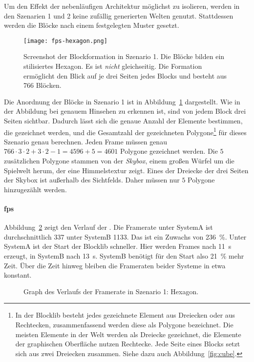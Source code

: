 
Um den Effekt der nebenläufigen Architektur möglichst zu isolieren, werden in den Szenarien 1 und 2 keine zufällig generierten Welten genutzt. Stattdessen werden die Blöcke nach einem festgelegten Muster gesetzt.

\begin{figure}
	\centering
	\texttt{[image: fps-hexagon.png]}
	\caption[Screenshot der Blockformation in Szenario 1 der Performanceanalyse.]{Screenshot der Blockformation in Szenario 1. Die Blöcke bilden ein stilisiertes Hexagon. Es ist \emph{nicht} gleichseitig. Die Formation ermöglicht den Blick auf je drei Seiten jedes Blocks und besteht aus 766 Blöcken.}\label{fig:hexagon}
\end{figure}
Die Anordnung der Blöcke in Szenario 1 ist in Abbildung~\ref{fig:hexagon} dargestellt. Wie in der Abbildung bei genauem Hinsehen zu erkennen ist, sind von jedem Block drei Seiten sichtbar. Dadurch lässt sich die genaue Anzahl der Elemente bestimmen, die gezeichnet werden, und die Gesamtzahl der gezeichneten Polygone\footnote{In der Blocklib besteht jedes gezeichnete Element aus Dreiecken oder aus Rechtecken, zusammenfassend werden diese als Polygone bezeichnet. Die meisten Elemente in der Welt werden als Dreiecke gezeichnet, die Elemente der graphischen Oberfläche nutzen Rechtecke. Jede Seite eines Blocks setzt sich aus zwei Dreiecken zusammen. Siehe dazu auch Abbildung~\vref{fig:cube}.} für dieses Szenario genau berechnen. Jeden Frame müssen genau $766\cdot3\cdot2 + 3\cdot2-1 = 4596 +5 = 4601$ Polygone gezeichnet werden. Die $5$ zusätzlichen Polygone stammen von der \emph{Skybox}, einem großen Würfel um die Spielwelt herum, der eine Himmelstextur zeigt. Eines der Dreiecke der drei Seiten der Skybox ist außerhalb des Sichtfelds. Daher müssen nur $5$ Polygone hinzugezählt werden.


\paragraph{\ac{fps}} Abbildung~\ref{fig:seed-0-hexagon-fps} zeigt den Verlauf der \si{\fps}. Die Framerate unter SystemA ist durchschnittlich \SI{337}{\fps} unter SystemB \SI{1133}{\fps}. Das ist ein Zuwachs von \SI{236}{\percent}. Unter SystemA ist der Start der Blocklib schneller. Hier werden Frames nach \SI{11}{\second} erzeugt, in SystemB nach \SI{13}{\second}. SystemB benötigt für den Start also \SI{21}{\percent} mehr Zeit. Über die Zeit hinweg bleiben die Frameraten beider Systeme in etwa konstant.
\begin{figure}[!htbp]
	\settowidth{}
	\caption{Graph des Verlaufs der Framerate in Szenario 1: Hexagon.}\label{fig:seed-0-hexagon-fps}
\end{figure}


